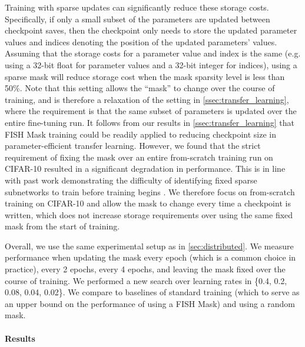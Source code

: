 Training with sparse updates can significantly reduce these storage costs. Specifically, if only a small subset of the parameters are updated between checkpoint saves, then the checkpoint only needs to store the updated parameter values and indices denoting the position of the updated parameters' values. Assuming that the storage costs for a parameter value and index is the same (e.g. using a 32-bit float for parameter values and a 32-bit integer for indices), using a sparse mask will reduce storage cost when the mask sparsity level is less than 50\%.
Note that this setting allows the ``mask'' to change over the course of training, and is therefore a relaxation of the setting in \ref{ssec:transfer_learning}, where the requirement is that the same subset of parameters is updated over the entire fine-tuning run. It follows from our results in \ref{ssec:transfer_learning} that FISH Mask training could be readily applied to reducing checkpoint size in parameter-efficient transfer learning. However, we found that the strict requirement of fixing the mask over an entire from-scratch training run on CIFAR-10 resulted in a significant degradation in performance. This is in line with past work demonstrating the difficulty of identifying fixed sparse subnetworks to train before training begins \cite{frankle2018lottery}. We therefore focus on from-scratch training on CIFAR-10 and allow the mask to change every time a checkpoint is written, which does not increase storage requirements over using the same fixed mask from the start of training.

Overall, we use the same experimental setup as in \ref{sec:distributed}.
We measure performance when updating the mask every epoch (which is a common choice in practice), every 2 epochs, every 4 epochs, and leaving the mask fixed over the course of training. We performed a new search over learning rates in \{0.4, 0.2, 0.08, 0.04, 0.02\}.
We compare to baselines of standard training (which to serve as an upper bound on the performance of using a FISH Mask) and using a random mask.

\paragraph{Results}


